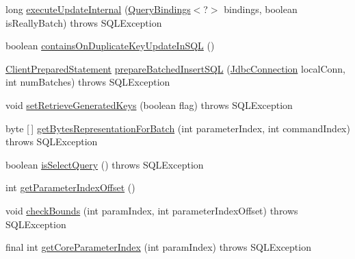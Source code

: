 \begin{DoxyCompactItemize}
\item 
long \mbox{\hyperlink{classcom_1_1mysql_1_1cj_1_1jdbc_1_1_client_prepared_statement_ababbfe9c3963f27842243160c2464af1}{execute\+Update\+Internal}} (\mbox{\hyperlink{interfacecom_1_1mysql_1_1cj_1_1_query_bindings}{Query\+Bindings}}$<$?$>$ bindings, boolean is\+Really\+Batch)  throws S\+Q\+L\+Exception 
\item 
boolean \mbox{\hyperlink{classcom_1_1mysql_1_1cj_1_1jdbc_1_1_client_prepared_statement_ab6bef693a8292d5c2438506df5936d3e}{contains\+On\+Duplicate\+Key\+Update\+In\+S\+QL}} ()
\item 
\mbox{\hyperlink{classcom_1_1mysql_1_1cj_1_1jdbc_1_1_client_prepared_statement}{Client\+Prepared\+Statement}} \mbox{\hyperlink{classcom_1_1mysql_1_1cj_1_1jdbc_1_1_client_prepared_statement_a43c466c6a5b4c8094dd1f0ce8963feb4}{prepare\+Batched\+Insert\+S\+QL}} (\mbox{\hyperlink{interfacecom_1_1mysql_1_1cj_1_1jdbc_1_1_jdbc_connection}{Jdbc\+Connection}} local\+Conn, int num\+Batches)  throws S\+Q\+L\+Exception 
\item 
void \mbox{\hyperlink{classcom_1_1mysql_1_1cj_1_1jdbc_1_1_client_prepared_statement_afa272c129ff89181b395f2233e9220fd}{set\+Retrieve\+Generated\+Keys}} (boolean flag)  throws S\+Q\+L\+Exception 
\item 
byte \mbox{[}$\,$\mbox{]} \mbox{\hyperlink{classcom_1_1mysql_1_1cj_1_1jdbc_1_1_client_prepared_statement_a775b294248ab992f62e3ed346bce51f8}{get\+Bytes\+Representation\+For\+Batch}} (int parameter\+Index, int command\+Index)  throws S\+Q\+L\+Exception 
\item 
boolean \mbox{\hyperlink{classcom_1_1mysql_1_1cj_1_1jdbc_1_1_client_prepared_statement_a3c78dbd07c4a62c42baf38e02fd691ea}{is\+Select\+Query}} ()  throws S\+Q\+L\+Exception 
\item 
int \mbox{\hyperlink{classcom_1_1mysql_1_1cj_1_1jdbc_1_1_client_prepared_statement_afdf6283ef90f080a94509fa39905e3ca}{get\+Parameter\+Index\+Offset}} ()
\item 
void \mbox{\hyperlink{classcom_1_1mysql_1_1cj_1_1jdbc_1_1_client_prepared_statement_a0a3f2b5e075cf12e681586a5f7e2a5d2}{check\+Bounds}} (int param\+Index, int parameter\+Index\+Offset)  throws S\+Q\+L\+Exception 
\item 
final int \mbox{\hyperlink{classcom_1_1mysql_1_1cj_1_1jdbc_1_1_client_prepared_statement_a3a9ad28da0a88ee861d1484c872ea206}{get\+Core\+Parameter\+Index}} (int param\+Index)  throws S\+Q\+L\+Exception 
\end{DoxyCompactItemize}
